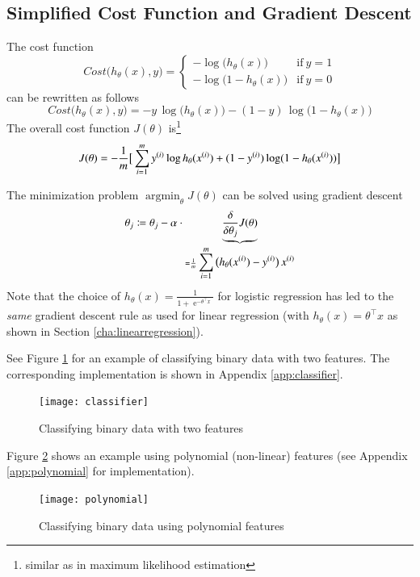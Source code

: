 \documentclass[a4paper,twoside,10pt]{article}
\begin{document}
\subsection{Simplified Cost Function and Gradient Descent}
The cost function
\begin{equation*}
Cost\big(h_\theta(x),y\big)=
\left\{\begin{array}{rl}-\operatorname{log}\big(h_\theta(x)\big)&\mathrm{if\ }y=1\\
-\operatorname{log}\big(1-h_\theta(x)\big)&\mathrm{if\ }y=0\end{array}\right.
\end{equation*}
can be rewritten as follows
\begin{equation*}
Cost\big(h_\theta(x),y\big)=
-y\,\operatorname{log}\big(h_\theta(x)\big)-(1-y)\,\operatorname{log}\big(1-h_\theta(x)\big)
\end{equation*}
The overall cost function $J(\theta)$ is\footnote{similar as in maximum likelihood estimation}
\begin{equation*}
  J(\theta)=-\frac{1}{m}\big[\displaystyle\sum_{i=1}^my^{(i)}\operatorname{log}h_\theta(x^{(i)})+(1-y^{(i)})\operatorname{log}(1-h_\theta(x^{(i)}))\big]
\end{equation*}

The minimization problem $\mathop{\operatorname{argmin}}_\theta J(\theta)$ can be solved using gradient descent
\begin{equation*}
  \theta_j\coloneqq\theta_j-\alpha\cdot\underbrace{\frac{\delta}{\delta\theta_j}J(\theta)}_
  {=\frac{1}{m}\displaystyle\sum_{i=1}^m\big(h_\theta(x^{(i)})-y^{(i)}\big)\,x^{(i)}}
\end{equation*}
Note that the choice of $h_\theta(x)=\frac{1}{1+\operatorname{e}^{-\theta^\top x}}$ for logistic regression has led to the \emph{same} gradient descent rule as used for linear regression (with $h_\theta(x)=\theta^\top x$ as shown in Section \ref{cha:linearregression}).

See Figure \ref{fig:classifier} for an example of classifying binary data with two features.
The corresponding implementation is shown in Appendix \ref{app:classifier}.
\begin{figure}[htbp]
  \begin{center}
    \texttt{[image: classifier]}
    \caption{Classifying binary data with two features\label{fig:classifier}}
  \end{center}
\end{figure}

Figure \ref{fig:polynomial} shows an example using polynomial (non-linear) features (see Appendix \ref{app:polynomial} for implementation).
\begin{figure}[htbp]
  \begin{center}
    \texttt{[image: polynomial]}
    \caption{Classifying binary data using polynomial features\label{fig:polynomial}}
  \end{center}
\end{figure}
\end{document}
